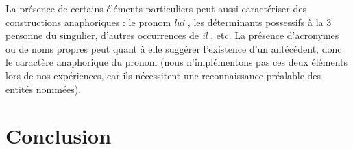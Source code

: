 \documentclass[a4paper,12pt]{article}
\begin{document}
La présence de certains éléments particuliers peut aussi caractériser des constructions anaphoriques : le pronom \og \textit{lui} \fg{}, les déterminants possessifs à la 3 personne du singulier, d'autres occurrences de \og \textit{il} \fg{}, etc. La présence d'acronymes ou de noms propres peut quant à elle suggérer l'existence d'un antécédent, donc le caractère anaphorique du pronom (nous n'implémentons pas ces deux éléments lors de nos expériences, car ils nécessitent une reconnaissance préalable des entités nommées).



\section*{Conclusion}





\end{document}
